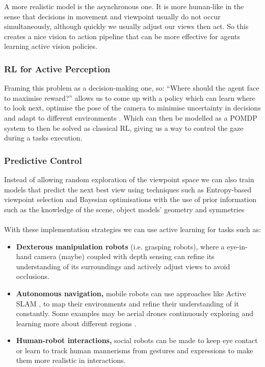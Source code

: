   A more realistic model is the asynchronous one. It is more human-like in the sense that decisions in movement and viewpoint usually do not occur simultaneously, although quickly we usually adjust our views then act. So this creates a nice vision to action pipeline that can be more effective for agents learning active vision policies.
  

  \subsubsection{RL for Active Perception}
    Framing this problem as a decision-making one, so: ``Where should the agent face to maximise reward?'' allows us to come up with a policy which can learn where to look next, optimise the pose of the camera to minimise uncertainty in decisions and adapt to different environments \cite{rothbucher2011,zhangembodied}. Which can then be modelled as a POMDP system to then be solved as classical RL, giving us a way to control the gaze during a tasks execution.

  \subsubsection{Predictive Control}
  Instead of allowing random exploration of the viewpoint space we can also train models that predict the next best view using techniques such as Entropy-based viewpoint selection and Bayesian optimisations with the use of prior information such as the knowledge of the scene, object models' geometry and symmetries \cite{dhami2023prednbvpredictionguidednextbestview3d,breyer2022closedloopnextbestviewplanningtargetdriven}
  \\\\
  With these implementation strategies we can use active learning for tasks such as:
  \begin{itemize}
    \item \textbf{Dexterous manipulation robots} (i.e. grasping robots), where a eye-in-hand camera (maybe) coupled with depth sensing can refine its understanding of its surroundings and actively adjust views to avoid occlusions. 
    \item \textbf{Autonomous navigation,} mobile robots can use approaches like Active SLAM \cite{s23198097}, to map their environments and refine their understanding of it constantly. Some examples may be aerial drones continuously exploring and learning more about different regions \cite{drones6040085}.
    \item \textbf{Human-robot interactions,} social robots can be made to keep eye contact or learn to track human mannerisms from gestures and expressions to make them more realistic in interactions.
  \end{itemize}
    
